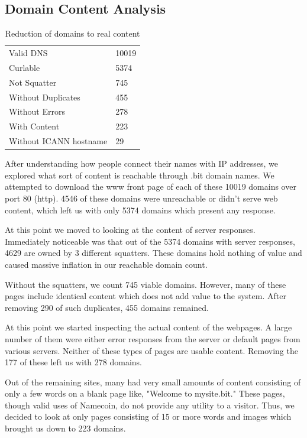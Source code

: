 \subsection{Domain Content Analysis}
\label{domainbreakdown}

\begin{table}[t]
\begin{tabular}{ll}
Valid DNS          &  10019  \\
Curlable        & 5374     \\
Not Squatter        & 745     \\
Without Duplicates      & 455     \\
Without Errors              & 278    \\
With Content              & 223    \\
Without ICANN hostname   & 29   \\
\end{tabular}
\caption{Reduction of domains to real content}
\end{table}

After understanding how people connect their names with IP addresses, we explored what sort of content is reachable through .bit domain names. We attempted to download the www front page of each of these 10019 domains over port 80 (http). 4546 of these domains were unreachable or didn't serve web content, which left us with only 5374 domains which present any response.

At this point we moved to looking at the content of server responses. Immediately noticeable was that out of the 5374 domains with server responses, 4629 are owned by 3 different squatters. These domains hold nothing of value and caused massive inflation in our reachable domain count.

Without the squatters, we count 745 viable domains. However, many of these pages include identical content which does not add value to the system. After removing 290 of such duplicates, 455 domains remained.

At this point we started inspecting the actual content of the webpages. A large number of them were either error responses from the server or default pages from various servers. Neither of these types of pages are usable content. Removing the 177 of these left us with 278 domains.

Out of the remaining sites, many had very small amounts of content consisting of only a few words on a blank page like, "Welcome to mysite.bit." These pages, though valid uses of Namecoin, do not provide any utility to a visitor. Thus, we decided to look at only pages consisting of 15 or more words and images which brought us down to 223 domains.

